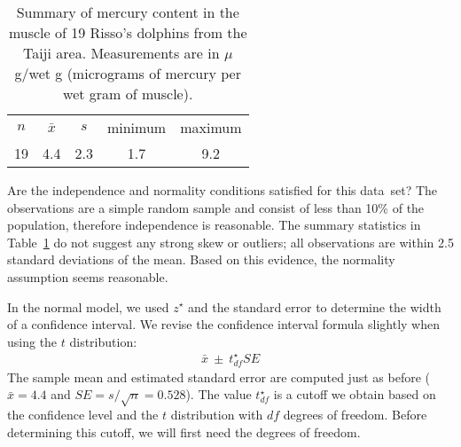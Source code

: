 \begin{table}[h]
\centering
\begin{tabular}{ccc cc}
\hline
$n$ & $\bar{x}$ & $s$ & minimum & maximum \\
19   & 4.4	  & 2.3  & 1.7	       & 9.2 \\
\hline
\end{tabular}
\caption{Summary of mercury content in the muscle of 19 Risso's dolphins from the Taiji area. Measurements are in $\mu$g/wet g (micrograms of mercury per wet gram of muscle).}
\label{summaryStatsOfHgInMuscleOfRissosDolphins}
\end{table}

\begin{example}{
Are the independence and normality conditions satisfied for this data~set?}
The observations are a simple random sample and consist of less than 10\% of the population, therefore independence is reasonable. The summary statistics in Table~\ref{summaryStatsOfHgInMuscleOfRissosDolphins} do not suggest any strong skew or outliers; all observations are within 2.5 standard deviations of the mean. Based on this evidence, the normality assumption seems reasonable.
\end{example}

In the normal model, we used $z^{\star}$ and the standard error to determine the width of a confidence interval. We revise the confidence interval formula slightly when using the $t$ distribution:
\begin{eqnarray*}
\bar{x} \ \pm\  t^{\star}_{df}SE
\end{eqnarray*}
The sample mean and estimated standard error are computed just as before ($\bar{x} = 4.4$ and $SE = s/\sqrt{n} = 0.528$). The value $t^{\star}_{df}$ is a cutoff we obtain based on the confidence level and the $t$ distribution with $df$ degrees of freedom. Before determining this cutoff, we will first need the degrees of freedom.


